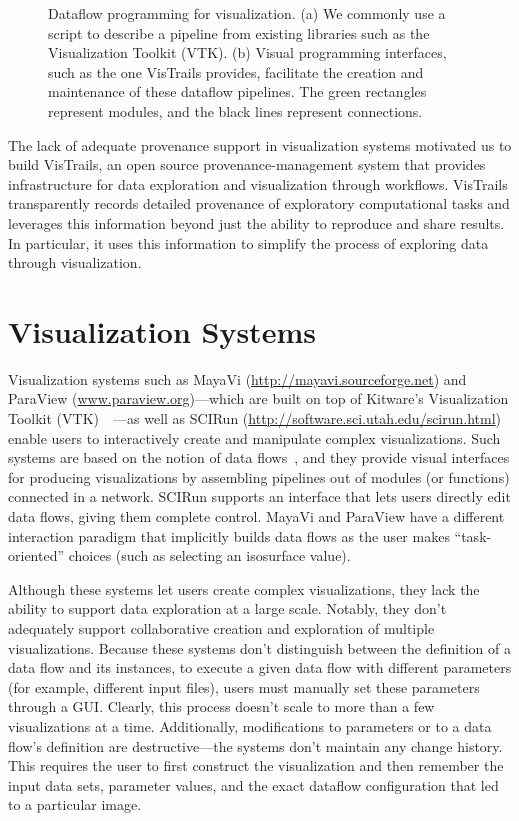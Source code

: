 \documentclass[11pt,twocolumn]{article}
\begin{document}
\begin{figure}[t]
\caption{Dataflow programming for visualization. (a) We commonly use a
  script to describe a pipeline from existing libraries such as the
  Visualization Toolkit (VTK). (b) Visual programming interfaces, such
  as the one VisTrails provides, facilitate the creation and
  maintenance of these dataflow pipelines. The green rectangles
  represent modules, and the black lines represent connections.}
\label{fig:fig1}
\end{figure}

The lack of adequate provenance support in visualization systems
motivated us to build VisTrails, an open source provenance-management
system that provides infrastructure for data exploration and
visualization through workflows. VisTrails transparently records
detailed provenance of exploratory computational tasks and leverages
this information beyond just the ability to reproduce and share
results. In particular, it uses this information to simplify the
process of exploring data through visualization.

\section{Visualization Systems}

Visualization systems such as MayaVi
(\url{http://mayavi.sourceforge.net}) and ParaView
(\url{www.paraview.org})—which are built on top of Kitware's
Visualization Toolkit (VTK)~\cite{Schroeder:2003:VTK}~—as well as
SCIRun (\url{http://software.sci.utah.edu/scirun.html}) enable users
to interactively create and manipulate complex visualizations. Such
systems are based on the notion of data flows~\cite{lee@ieee1995}, and
they provide visual interfaces for producing visualizations by
assembling pipelines out of modules (or functions) connected in a
network. SCIRun supports an interface that lets users directly edit
data flows, giving them complete control. MayaVi and ParaView have a
different interaction paradigm that implicitly builds data flows as
the user makes “task-oriented” choices (such as selecting an
isosurface value).


Although these systems let users create complex visualizations, they
lack the ability to support data exploration at a large scale.
Notably, they don’t adequately support collaborative creation and
exploration of multiple visualizations. Because these systems don’t
distinguish between the definition of a data flow and its instances,
to execute a given data flow with different parameters (for example,
different input files), users must manually set these parameters
through a GUI. Clearly, this process doesn’t scale to more than a few
visualizations at a time. Additionally, modifications to parameters or
to a data flow’s definition are destructive—the systems don’t maintain
any change history. This requires the user to first construct the
visualization and then remember the input data sets, parameter values,
and the exact dataflow configuration that led to a particular image.
\end{document}
